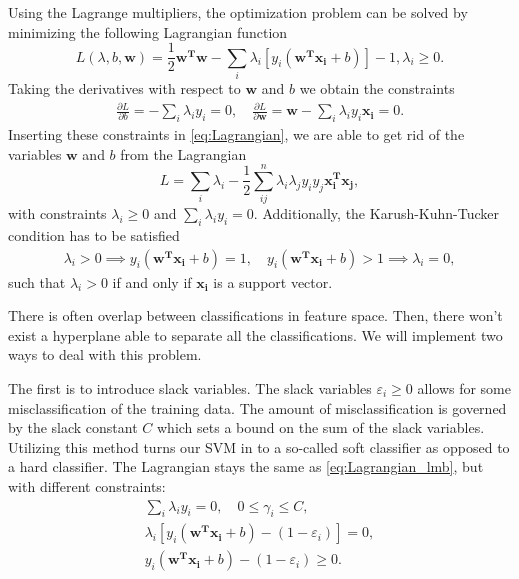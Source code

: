 Using the Lagrange multipliers, the optimization problem can be solved by minimizing 
the following Lagrangian function
\begin{equation}
	L(\lambda ,b,\boldsymbol{w})=\frac{1}{2}\boldsymbol{w^Tw}-\sum_{i} \lambda _i[y_i(\boldsymbol{w^Tx_i}+b)]-1,\lambda _i \ge0. 
	\label{eq:Lagrangian}
\end{equation}
Taking the derivatives with respect to $\boldsymbol{w}$ and $b$ we obtain the constraints 
\begin{gather*}
\frac{\partial L}{\partial b}=-\sum_{i} \lambda _i y_i=0,
\quad \frac{\partial L}{\partial \boldsymbol{w} }= \boldsymbol{w} -\sum_{i} \lambda _i y_i \boldsymbol{x_i} =0.
\end{gather*}
Inserting these constraints in \autoref{eq:Lagrangian}, we are able to get rid 
of the variables $\boldsymbol{w}$ and $b$ from the Lagrangian
\begin{equation}
L = \sum_{i} \lambda _i - \frac{1}{2}\sum_{ij}^{n} \lambda _i \lambda _j y_i y_j \boldsymbol{x_i^Tx_j},
\label{eq:Lagrangian_lmb}
\end{equation}
with constraints $\lambda _i \ge 0$ and $\sum_{i} \lambda _iy_i=0$.
Additionally, the Karush-Kuhn-Tucker condition has to be satisfied
\begin{gather*}
\lambda _i >0 \implies y_i(\boldsymbol{w^Tx_i}+b)=1, \quad y_i(\boldsymbol{w^Tx_i}+b)>1 \implies \lambda _i = 0,
\end{gather*}
such that $\lambda _i>0$ if and only if $\boldsymbol{x_i}$ is a support vector. 

There is often overlap between classifications in feature space. Then, there 
won't exist a hyperplane able to separate all the classifications. We will 
implement two ways to deal with this problem. 

The first is to introduce slack variables. The slack variables 
$\varepsilon _i \ge  0$ allows for some misclassification of 
the training data. The amount of misclassification is governed by the 
slack constant $C$ which sets a bound on the sum of the slack variables.  
Utilizing this method turns our SVM in to a so-called soft classifier as 
opposed to a hard classifier. 
The Lagrangian stays the same as \autoref{eq:Lagrangian_lmb}, but 
with different constraints:
\begin{gather*}
	\sum_{i} \lambda _i y_i = 0, \quad 0 \le \gamma _i \le C,\\
	\lambda _i[y_i(\boldsymbol{w^Tx_i}+b)-(1-\varepsilon _i)]=0,\\
y_i(\boldsymbol{w^Tx_i}+b)-(1-\varepsilon _i) \ge 0.
\end{gather*}

